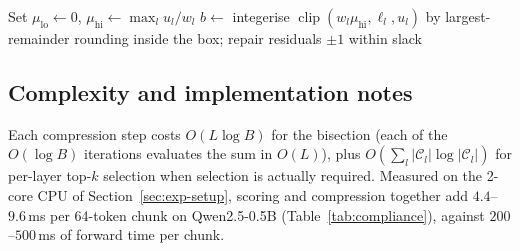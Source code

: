 \begin{algorithm}[t]
\SetAlFnt{\small}
\SetAlCapFnt{\small}
\SetAlCapNameFnt{\small}
Set $\mu_{\mathrm{lo}}\leftarrow0$,
$\mu_{\mathrm{hi}}\leftarrow\max_l u_l/w_l$\;
$b\leftarrow$ integerise $\operatorname{clip}(w_l\mu_{\mathrm{hi}},\ell_l,u_l)$
by largest-remainder rounding inside the box; repair residuals $\pm1$
within slack\;
\caption{One compression step of \sage{} (\acs{}+$\laba$+\dre). The
bisection is the capped water-filling projection of
Theorem~\ref{thm:exact}; baselines replace the weights or the ranking
while keeping steps 1--7 identical. The assertion is executed in code,
not merely claimed: every run of Section~\ref{sec:exp} aborts on
violation.}
\label{alg:sage}
\end{algorithm}

\subsection{Complexity and implementation notes}

Each compression step costs $O(L\log B)$ for the bisection (each of the
$O(\log B)$ iterations evaluates the sum in $O(L)$), plus $O(\sum_l
|\mathcal{C}_l|\log|\mathcal{C}_l|)$ for per-layer top-$k$ selection when
selection is actually required. Measured on the 2-core CPU of
Section~\ref{sec:exp-setup}, scoring and compression together add
$4.4$--$9.6$\,ms per 64-token chunk on Qwen2.5-0.5B
(Table~\ref{tab:compliance}), against $200$--$500$\,ms of forward time
per chunk.

